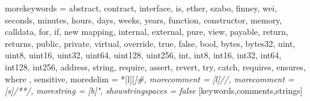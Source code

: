 


%
{morekeywords = {
  abstract, contract, interface, is,
  ether, szabo, finney, wei,
  seconds, minutes, hours, days, weeks, years,
  function, constructor, memory, calldata,
  for, if, new
  mapping,
  internal, external, pure, view, payable, return, returns,
  public, private, virtual, override,
  true, false, bool,
  bytes, bytes32,
  uint, uint8, uint16, uint32, uint64, uint128, uint256,
  int, int8, int16, int32, int64, int128, int256,
  address, string,
  require, assert, revert, try, catch,
  requires, ensures, where
  },%
  sensitive,%
  moredelim = *[l][\itshape]{\#},
  morecomment = [l]//,%
  morecomment = [s]{/*}{*/},%
  morestring = [b]",%
  showstringspaces = false%
}[keywords,comments,strings]%



